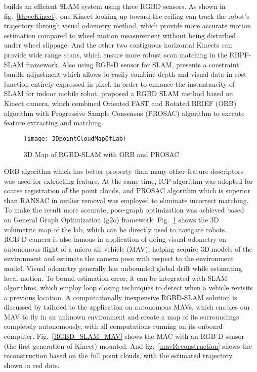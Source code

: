 %
\cite{RGBDSLAMsystem_2013} builds an efficient SLAM system using three RGBD sensors. As shown in fig.~\ref{threeKinect}, one Kinect looking up toward the ceiling can track the robot’s trajectory through visual odometry method, which provide more accurate motion estimation compared to wheel motion measurement without being disturbed under wheel slippage. And the other two contiguous horizontal Kinects can provide wide range scans, which ensure more robust scan matching in the RBPF-SLAM framework. Also using RGB-D sensor for SLAM, \cite{bundleSLAMRGBD_2015} presents a constraint bundle adjustment which allows to easily combine depth and visual data in cost function entirely expressed in pixel. In order to enhance the instantaneity of SLAM for indoor mobile robot, \cite{indorRGBDSLAM_2015} proposed a RGBD SLAM method based on Kinect camera, which combined Oriented FAST and Rotated BRIEF (ORB) algorithm with Progressive Sample Consensus (PROSAC) algorithm to execute feature extracting and matching. %
%
%
\begin{figure}[t]
\centering
\texttt{[image: 3DpointCloudMapOfLab]}
\caption{3D Map of RGBD-SLAM with ORB and PROSAC \cite{indorRGBDSLAM_2015}}
\label{3DpointCloudMapOfLab}
\end{figure}%
%
ORB algorithm which has better property than many other feature descriptors was used for extracting feature. At the same time, ICP algorithm was adopted for coarse registration of the point clouds, and PROSAC algorithm which is superior than RANSAC in outlier removal was employed to eliminate incorrect matching. To make the result more accurate, pose-graph optimization was achieved based on General Graph Optimization (g2o) framework. Fig.~\ref{3DpointCloudMapOfLab} shows the 3D volumetric map of the lab, which can be directly used to navigate robots.
\\\indent%
RGB-D camera is also famous in application of doing visual odometry on autonomous flight of a micro air vehicle (MAV), helping acquire 3D models of the environment and estimate the camera pose with respect to the environment model. Visual odometry generally has unbounded global drift while estimating local motion. To bound estimation error, it can be integrated with SLAM algorithms, which employ loop closing techniques to detect when a vehicle revisits a previous location. A computationally inexpensive RGBD-SLAM solution is discussed by \cite{RGBDSLAMmav_2013} tailored to the application on autonomous MAVs, which enables our MAV to fly in an unknown environment and create a map of its surroundings completely autonomously, with all computations running on its onboard computer. Fig.~\ref{RGBD_SLAM_MAV} shows the MAC with an RGB-D sensor (the first generation of Kinect) mounted. And fig.~\ref{mavReconstruction} shows the reconstruction based on the full point clouds, with the estimated trajectory shown in red dots. 
